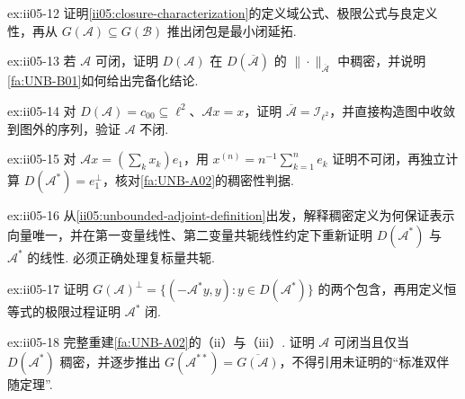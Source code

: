 \begin{FAExercise}[闭包的序列刻画与最小性]{ex:ii05-12}
证明\autoref{ii05:closure-characterization}的定义域公式、极限公式与良定义性，再从 \(\displaystyle G(\mathcal A)\subseteq G(\mathcal B)\) 推出闭包是最小闭延拓.
\end{FAExercise}

\begin{FAExercise}[图范数完备化]{ex:ii05-13}
若 \(\displaystyle\mathcal A\) 可闭，证明 \(\displaystyle D(\mathcal A)\) 在 \(\displaystyle D(\overline{\mathcal A})\) 的 \(\displaystyle\|\cdot\|_{\overline{\mathcal A}}\) 中稠密，并说明\autoref{fa:UNB-B01}如何给出完备化结论.
\end{FAExercise}

\begin{FAExercise}[可闭但不闭]{ex:ii05-14}
对 \(\displaystyle D(\mathcal A)=c_{00}\subseteq\ell^2\)、\(\displaystyle\mathcal Ax=x\)，证明 \(\displaystyle\overline{\mathcal A}=\mathcal I_{\ell^2}\)，并直接构造图中收敛到图外的序列，验证 \(\displaystyle\mathcal A\) 不闭.
\end{FAExercise}

\begin{FAExercise}{ex:ii05-15}
对 \(\displaystyle\mathcal Ax=(\sum_kx_k)e_1\)，用 \(\displaystyle x^{(n)}=n^{-1}\sum_{k=1}^ne_k\) 证明不可闭，再独立计算 \(\displaystyle D(\mathcal A^*)=e_1^\perp\)，核对\autoref{fa:UNB-A02}的稠密性判据.
\end{FAExercise}

\begin{FAExercise}[无界伴随的定义与标量约定]{ex:ii05-16}
从\autoref{ii05:unbounded-adjoint-definition}出发，解释稠密定义为何保证表示向量唯一，并在第一变量线性、第二变量共轭线性约定下重新证明 \(\displaystyle D(\mathcal A^*)\) 与 \(\displaystyle\mathcal A^*\) 的线性. 必须正确处理复标量共轭.
\end{FAExercise}

\begin{FAExercise}[图正交恒等式与伴随闭性]{ex:ii05-17}
证明 \(\displaystyle G(\mathcal A)^\perp=\{(-\mathcal A^*y,y):y\in D(\mathcal A^*)\}\) 的两个包含，再用定义恒等式的极限过程证明 \(\displaystyle\mathcal A^*\) 闭.
\end{FAExercise}

\begin{FAExercise}{ex:ii05-18}
完整重建\autoref{fa:UNB-A02}的（ii）与（iii）. 证明 \(\displaystyle\mathcal A\) 可闭当且仅当 \(\displaystyle D(\mathcal A^*)\) 稠密，并逐步推出 \(\displaystyle G(\mathcal A^{**})=\overline{G(\mathcal A)}\)，不得引用未证明的“标准双伴随定理”.
\end{FAExercise}

